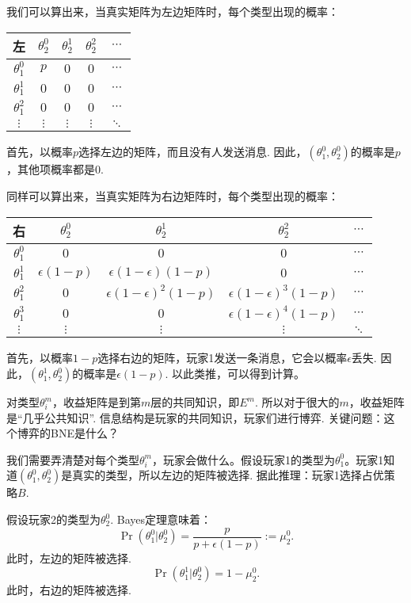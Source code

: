 我们可以算出来，当真实矩阵为左边矩阵时，每个类型出现的概率：
\begin{table}[ht]
    \centering
\begin{tabular}{c|cccc}
左& $\theta_2^0$ & $\theta_2^1$ & $\theta_2^2$ & $\cdots$ \\
\hline
$\theta_1^0$ & $p$ & $0$ & $0$ & $\cdots$ \\
$\theta_1^1$ & $0$ & $0$ & $0$ & $\cdots$ \\
$\theta_1^2$ & $0$ & $0$ & $0$ & $\cdots$ \\
$\vdots$ & $\vdots$ & $\vdots$ & $\vdots$ & $\ddots$
\end{tabular}
\end{table}
首先，以概率$p$选择左边的矩阵，而且没有人发送消息. 因此，$(\theta_1^0,\theta_2^0)$的概率是$p$，其他项概率都是$0$.

同样可以算出来，当真实矩阵为右边矩阵时，每个类型出现的概率：
\begin{table}[ht]
    \centering
\begin{tabular}{c|cccc}
右& $\theta_2^0$ & $\theta_2^1$ & $\theta_2^2$ & $\cdots$ \\
\hline
$\theta_1^0$ & $0$ & $0$ & $0$ & $\cdots$ \\
$\theta_1^1$ & $\epsilon(1 - p)$ & $\epsilon(1 - \epsilon)(1 - p)$ & $0$ & $\cdots$ \\
$\theta_1^2$ & $0$ & $\epsilon(1 - \epsilon)^2(1 - p)$ & $\epsilon(1 - \epsilon)^3(1 - p)$ & $\cdots$ \\
$\theta_1^3$ & $0$ & $0$ & $\epsilon(1 - \epsilon)^4(1 - p)$ & $\cdots$ \\
$\vdots$ & $\vdots$ & $\vdots$ & $\vdots$ & $\ddots$
\end{tabular}
\end{table}
首先，以概率$1 - p$选择右边的矩阵，玩家1发送一条消息，它会以概率$\epsilon$丢失. 因此，$(\theta_1^1,\theta_2^0)$的概率是$\epsilon(1 - p)$. 以此类推，可以得到计算。

对类型$\theta_i^m$，收益矩阵是到第$m$层的共同知识，即$E^m$. 所以对于很大的$m$，收益矩阵是“几乎公共知识”. 信息结构是玩家的共同知识，玩家们进行博弈. 关键问题：这个博弈的BNE是什么？

我们需要弄清楚对每个类型$\theta_i^m$，玩家会做什么。假设玩家1的类型为$\theta_1^0$。玩家1知道$(\theta_1^0,\theta_2^0)$是真实的类型，所以左边的矩阵被选择. 据此推理：玩家1选择占优策略$B$.

假设玩家2的类型为$\theta_2^0$. Bayes定理意味着：
\[\Pr(\theta_1^0|\theta_2^0) = \frac{p}{p+\epsilon(1-p)} := \mu_2^0.\] 
此时，左边的矩阵被选择. 
\[\Pr(\theta_1^1|\theta_2^0) = 1 - \mu_2^0.\] 
此时，右边的矩阵被选择. 

